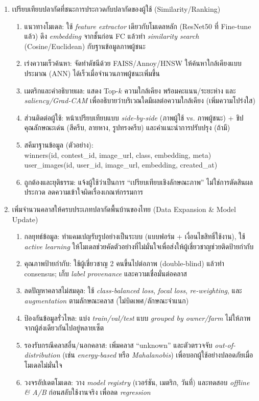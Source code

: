 \begin{sloppypar}
\begin{enumerate}
		\item เปรียบเทียบปลากัดที่ชนะการประกวดกับปลากัดของผู้ใช้ (Similarity/Ranking)
		\begin{enumerate}
			\item แนวทางโมเดล: ใช้ \emph{feature extractor} เดียวกับโมเดลหลัก (ResNet50 ที่ Fine-tune แล้ว) ดึง \emph{embedding} จากชั้นก่อน FC แล้วทำ \emph{similarity search} (Cosine/Euclidean) กับฐานข้อมูลภาพผู้ชนะ
			\item เร่งความเร็วค้นหา: จัดทำดัชนีด้วย FAISS/Annoy/HNSW ให้ค้นหาใกล้เคียงแบบประมาณ (ANN) ได้เร็วเมื่อจำนวนภาพผู้ชนะเพิ่มขึ้น
			\item เมตริกและคำอธิบายผล: แสดง Top-$k$ ความใกล้เคียง พร้อมคะแนน/ระยะห่าง และ \emph{saliency/Grad-CAM} เพื่ออธิบายว่าบริเวณใดมีผลต่อความใกล้เคียง (เพิ่มความโปร่งใส)
			\item ส่วนติดต่อผู้ใช้: หน้าเปรียบเทียบแบบ \emph{side-by-side} (ภาพผู้ใช้ vs. ภาพผู้ชนะ) + ชิปคุณลักษณะเด่น (สีครีบ, ลายหาง, รูปทรงครีบ) และคำแนะนำการปรับปรุง (ถ้ามี)
			\item สคีมาฐานข้อมูล (ตัวอย่าง): \\
			winners(id, contest\_id, image\_url, class, embedding, meta) \\
			user\_images(id, user\_id, image\_url, embedding, created\_at)
			\item ถูกต้องและยุติธรรม: แจ้งผู้ใช้ว่าเป็นการ ``เปรียบเทียบเชิงลักษณะภาพ'' ไม่ใช่การตัดสินผลประกวด ลดความเข้าใจผิดเรื่องเกณฑ์กรรมการ
		\end{enumerate}
		
		\item เพิ่มจำนวนคลาสให้ครบประเภทปลากัดพื้นบ้านของไทย (Data Expansion \& Model Update)
		\begin{enumerate}
			\item กลยุทธ์ข้อมูล: ทำแคมเปญรับรูปอย่างเป็นระบบ (แบบฟอร์ม + เงื่อนไขสิทธิ์ใช้งาน), ใช้ \emph{active learning} ให้โมเดลช่วยคัดตัวอย่างที่ไม่มั่นใจเพื่อส่งให้ผู้เชี่ยวชาญช่วยติดป้ายกำกับ
			\item คุณภาพป้ายกำกับ: ใช้ผู้เชี่ยวชาญ 2 คนขึ้นไปต่อภาพ (double-blind) แล้วทำ consensus; เก็บ \emph{label provenance} และความเชื่อมั่นต่อคลาส
			\item ลดปัญหาคลาสไม่สมดุล: ใช้ \emph{class-balanced loss}, \emph{focal loss}, \emph{re-weighting}, และ \emph{augmentation} ตามลักษณะคลาส (ไม่บิดเพศ/ลักษณะจำแนก)
			\item ป้องกันข้อมูลรั่วไหล: แบ่ง \emph{train/val/test} แบบ \emph{grouped by owner/farm} ไม่ให้ภาพจากผู้ส่งเดียวกันไปอยู่หลายเซ็ต
			\item รองรับกรณีคลาสอื่น/นอกคลาส: เพิ่มคลาส ``unknown'' และตัวตรวจจับ \emph{out-of-distribution} (เช่น \emph{energy-based} หรือ \emph{Mahalanobis}) เพื่อบอกผู้ใช้อย่างปลอดภัยเมื่อโมเดลไม่มั่นใจ
			\item วงจรอัปเดตโมเดล: วาง \emph{model registry} (เวอร์ชัน, เมตริก, วันที่) และทดสอบ \emph{offline \& A/B} ก่อนสลับใช้งานจริง เพื่อลด \emph{regression}
		\end{enumerate}
		

\end{enumerate}
\end{sloppypar}
